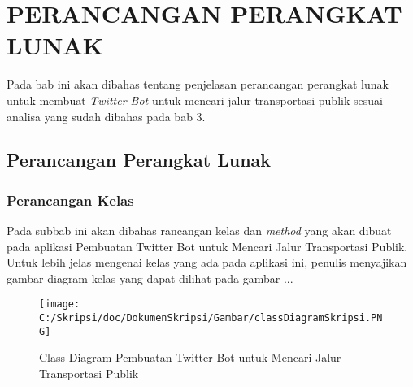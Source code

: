 \chapter{PERANCANGAN PERANGKAT LUNAK}
\label{chap:perancangan perangkat lunak}

Pada bab ini akan dibahas tentang penjelasan perancangan perangkat lunak untuk membuat \textit{Twitter Bot} untuk mencari jalur transportasi publik sesuai analisa yang sudah dibahas pada bab 3.

\section{Perancangan Perangkat Lunak}

\subsection{Perancangan Kelas}
Pada subbab ini akan dibahas rancangan kelas dan \textit{method} yang akan dibuat pada aplikasi Pembuatan Twitter Bot untuk Mencari Jalur Transportasi Publik. Untuk lebih jelas mengenai kelas yang ada pada aplikasi ini, penulis menyajikan gambar diagram kelas yang dapat dilihat pada gambar ...

\begin{figure}[htbp]
	\centering
		\texttt{[image: C:/Skripsi/doc/DokumenSkripsi/Gambar/classDiagramSkripsi.PNG]}
	\caption{Class Diagram Pembuatan Twitter Bot untuk Mencari Jalur Transportasi Publik}
	\label{fig:classDiagramSkripsi}
\end{figure}


